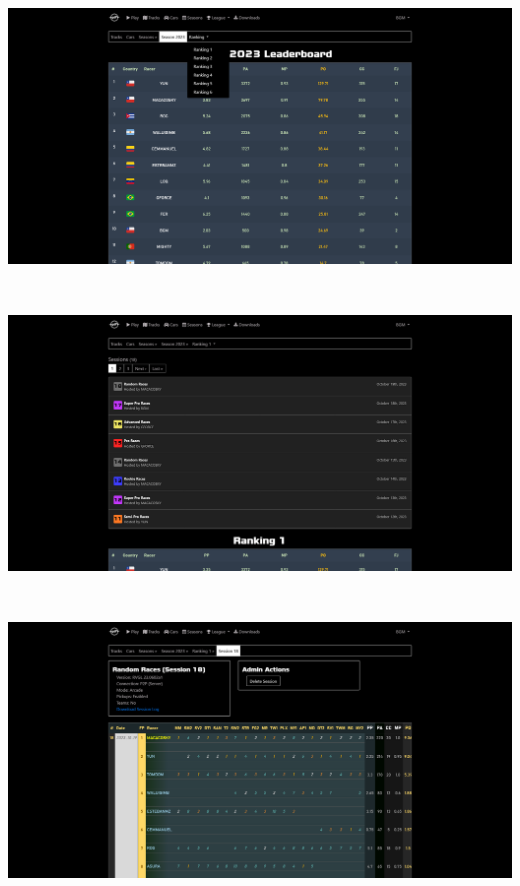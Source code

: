 \includegraphics[width=15cm, height=8cm]{img/season.png} \\

\includegraphics[width=15cm, height=8cm]{img/ranking.png} \\

\includegraphics[width=15cm, height=8cm]{img/session.png} \\

